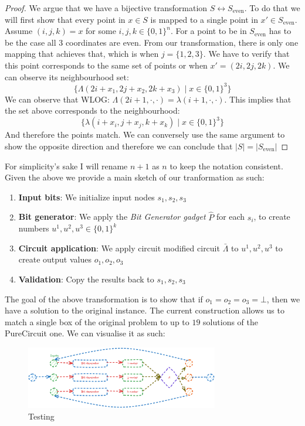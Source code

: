 \begin{proof}
    We argue that we have a bijective transformation $S \leftrightarrow S_{\text{even}}$. To do that we will
    first show that every point in $x \in S$ is mapped to a single point in $x' \in S_{\text{even}}$.
    Assume $(i,j,k) = x$ for some $i,j,k \in \{0,1\}^{n}$. For a point to be in $S_{\text{even}}$
    has to be the case all 3 coordinates are even. From our transformation, there is only one mapping
    that achieves that, which is when $j = \{1,2,3\}$. We have to verify that this point corresponds to the
    same set of points or when $x' = (2i , 2j, 2k)$. We can observe its neighbourhood set:
    $$
    \Big\{\Lambda(2i + x_1, 2j + x_2, 2k + x_3) \mid x \in \{0,1\}^3 \Big\}
    $$
    We can observe that WLOG: $\Lambda(2i + 1, \cdot, \cdot) = \lambda(i + 1, \cdot, \cdot)$. This implies that the set above
    corresponds to the neighbourhood:
    $$
    \Big\{\lambda(i + x_i, j + x_j, k + x_k) \mid x \in \{0,1\}^3 \Big\}
    $$
    And therefore the points match. We can conversely use the same argument to show the opposite
    direction and therefore we can conclude that $|S| = |S_{\text{even}}|$
\end{proof}
For simplicity's sake I will rename $n + 1$ as $n$ to keep the notation consistent.
Given the above we provide a main sketch of our tranformation as such:
\begin{enumerate}
    \item \textbf{Input bits}: We initialize input nodes $s_1, s_2, s_3$
    \item \textbf{Bit generator}: We apply the \textit{Bit Generator gadget} $\hat{P}$ for each $s_i$,
        to create numbers $u^1, u^2, u^3 \in \{0,1\}^{k}$
    \item \textbf{Circuit application}: We apply circuit modified circuit $\bar{\Lambda}$ to $u^1, u^2, u^3$ to create output values $o_1, o_2, o_3$
    \item \textbf{Validation}: Copy the results back to $s_1, s_2, s_3$
\end{enumerate}

The goal of the above transformation is to show that if $o_1 = o_2 =o_3 = \bot$, then we have a solution
to the original instance. The current construction allows us to match a single box of the original problem to
up to $19$ solutions of the PureCircuit one. We can visualise it as such:


\begin{figure}[h!]
    \centering
    \includegraphics[width=0.75\textwidth]{assets/reduction_sketch.png}
    \caption{Testing}
    \label{fig:main-proof:visualisation}
\end{figure}



